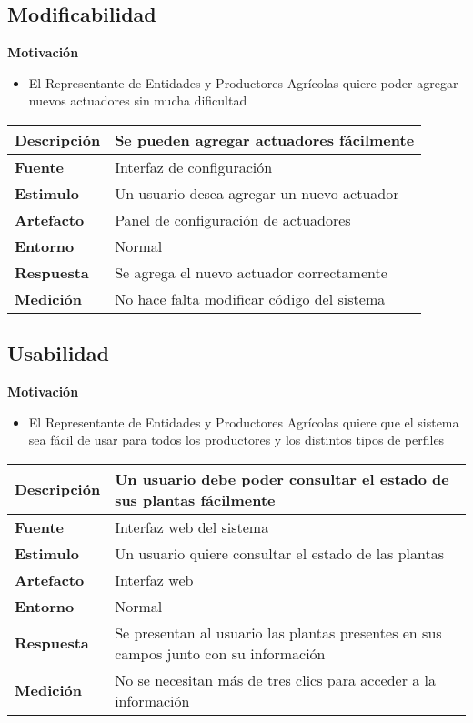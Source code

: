 \subsection{Modificabilidad}
\textbf{Motivación}
\begin{itemize}
 \item El Representante de Entidades y Productores Agr\'icolas quiere poder agregar nuevos actuadores sin mucha dificultad
\end{itemize}

\begin{tabular}{| l || p{12cm} |}
\hline 
\textbf{Descripci\'on} & Se pueden agregar actuadores fácilmente \\
\hline 
\textbf{Fuente} & Interfaz de configuración \\
\hline 
\textbf{Estimulo} & Un usuario desea agregar un nuevo actuador \\
\hline 
\textbf{Artefacto} & Panel de configuración de actuadores \\
\hline 
\textbf{Entorno} & Normal \\
\hline 
\textbf{Respuesta} & Se agrega el nuevo actuador correctamente \\
\hline 
\textbf{Medici\'on} & No hace falta modificar código del sistema \\
\hline 
\end{tabular}

\subsection{Usabilidad}
\textbf{Motivación}
\begin{itemize}
 \item El Representante de Entidades y Productores Agr\'icolas quiere que el sistema sea f\'acil de usar para todos los productores y los distintos tipos de perfiles
\end{itemize}

\begin{tabular}{| l || p{12cm} |}
\hline 
\textbf{Descripci\'on} & Un usuario debe poder consultar el estado de sus plantas fácilmente \\
\hline 
\textbf{Fuente} & Interfaz web del sistema \\
\hline 
\textbf{Estimulo} & Un usuario quiere consultar el estado de las plantas \\
\hline 
\textbf{Artefacto} & Interfaz web \\
\hline 
\textbf{Entorno} & Normal \\
\hline 
\textbf{Respuesta} & Se presentan al usuario las plantas presentes en sus campos junto con su información \\
\hline 
\textbf{Medici\'on} & No se necesitan más de tres clics para acceder a la información \\
\hline 
\end{tabular}